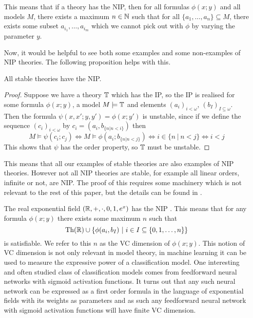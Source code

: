 This means that if a theory has the NIP, then for all formulas $\phi(x;y)$ and all models $M$,
there exists a maximum $n \in \mathbb{N}$ such that for all $\{a_1, \dots, a_n\} \subseteq M$, there exists
some subset ${a_{i_1}, \dots, a_{i_m}}$ which we cannot pick out with $\phi$ by varying the
parameter $y$.

Now, it would be helpful to see both some examples and some non-examples of NIP theories. The
following proposition helps with this.

\begin{prop}
  All stable theories have the NIP.
\end{prop}
\begin{proof}
  Suppose we have a theory $\mathbb{T}$ which has the IP, so the IP is realised for some formula
  $\phi(x;y)$, a model $M \models \mathbb{T}$ and elements $(a_i)_{i<\omega}$,
  $(b_I)_{I \subseteq \omega}$. Then the formula $\psi(x,x';y,y') = \phi(x;y')$ is unstable,
  since if we define the sequence $(c_i)_{i<\omega}$ by $c_i=(a_i,b_{\{n | n < i\}})$ then
  \begin{equation*}
    M \models \psi(c_i;c_j) \iff
      M \models \phi(a_i; b_{\{n|n < j\}}) \iff
      i \in \{n\ |\ n < j\} \iff
      i < j
  \end{equation*}
  This shows that $\psi$ has the order property, so $\mathbb{T}$ must be unstable.
\end{proof}

This means that all our examples of stable theories are also examples of NIP theories. However not
all NIP theories are stable, for example all linear orders, infinite or not, are NIP. The proof of
this requires some machinery which is not relevant to the rest of this paper, but the details
can be found in \cite{simon15}.


\begin{exmp}
  The real exponential field $(\mathbb{R},+,\cdot,0,1,e^x)$ has the NIP \cite{steinhorn1999}. This means
  that for any formula $\phi(x;y)$ there exists some maximum $n$ such that
  \begin{equation*}
    \operatorname{Th}(\mathbb{R}) \cup \{\phi(a_i,b_I)\ |\ i \in I \subseteq \{0,1,\dots,n\}\}
  \end{equation*}
  is satisfiable. We refer to this $n$ as the VC dimension of $\phi(x;y)$. This notion of VC
  dimension is not only relevant in model theory, in machine learning it can be used to measure the
  expressive power of a classification model. One interesting and often studied class of
  classification models comes from feedforward neural networks with sigmoid activation functions. It
  turns out that any such neural network can be expressed as a first order formula in the language
  of exponential fields with its weights as parameters \cite{macintyre93} and as such any
  feedforward neural network with sigmoid activation functions will have finite VC dimension.
\end{exmp}

